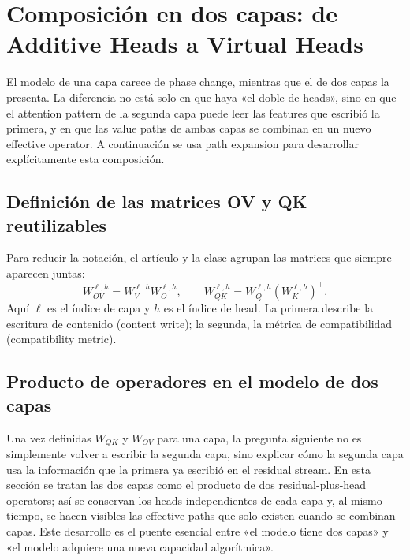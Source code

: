 \section{Composición en dos capas: de Additive Heads a Virtual Heads}

El modelo de una capa carece de phase change, mientras que el de dos capas la presenta. La diferencia no está solo en que haya «el doble de heads», sino en que el attention pattern de la segunda capa puede leer las features que escribió la primera, y en que las value paths de ambas capas se combinan en un nuevo effective operator. A continuación se usa path expansion para desarrollar explícitamente esta composición.


\subsection{Definición de las matrices OV y QK reutilizables}

Para reducir la notación, el artículo y la clase agrupan las matrices que siempre aparecen juntas:
\[
W_{OV}^{\ell,h}=W_V^{\ell,h}W_O^{\ell,h},
\qquad
W_{QK}^{\ell,h}=W_Q^{\ell,h}(W_K^{\ell,h})^{\top}.
\]
Aquí $\ell$ es el índice de capa y $h$ es el índice de head. La primera describe la escritura de contenido (content write); la segunda, la métrica de compatibilidad (compatibility metric).


\subsection{Producto de operadores en el modelo de dos capas}

Una vez definidas $W_{QK}$ y $W_{OV}$ para una capa, la pregunta siguiente no es simplemente volver a escribir la segunda capa, sino explicar cómo la segunda capa usa la información que la primera ya escribió en el residual stream. En esta sección se tratan las dos capas como el producto de dos residual-plus-head operators; así se conservan los heads independientes de cada capa y, al mismo tiempo, se hacen visibles las effective paths que solo existen cuando se combinan capas. Este desarrollo es el puente esencial entre «el modelo tiene dos capas» y «el modelo adquiere una nueva capacidad algorítmica».

